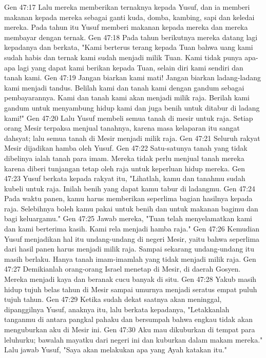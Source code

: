 Gen 47:17  Lalu mereka memberikan ternaknya kepada Yusuf, dan ia memberi makanan kepada mereka sebagai ganti kuda, domba, kambing, sapi dan keledai mereka. Pada tahun itu Yusuf memberi makanan kepada mereka dan mereka membayar dengan ternak.
Gen 47:18  Pada tahun berikutnya mereka datang lagi kepadanya dan berkata, "Kami berterus terang kepada Tuan bahwa uang kami sudah habis dan ternak kami sudah menjadi milik Tuan. Kami tidak punya apa-apa lagi yang dapat kami berikan kepada Tuan, selain diri kami sendiri dan tanah kami.
Gen 47:19  Jangan biarkan kami mati! Jangan biarkan ladang-ladang kami menjadi tandus. Belilah kami dan tanah kami dengan gandum sebagai pembayarannya. Kami dan tanah kami akan menjadi milik raja. Berilah kami gandum untuk menyambung hidup kami dan juga benih untuk ditabur di ladang kami!"
Gen 47:20  Lalu Yusuf membeli semua tanah di mesir untuk raja. Setiap orang Mesir terpaksa menjual tanahnya, karena masa kelaparan itu sangat dahsyat; lalu semua tanah di Mesir menjadi milik raja.
Gen 47:21  Seluruh rakyat Mesir dijadikan hamba oleh Yusuf.
Gen 47:22  Satu-satunya tanah yang tidak dibelinya ialah tanah para imam. Mereka tidak perlu menjual tanah mereka karena diberi tunjangan tetap oleh raja untuk keperluan hidup mereka.
Gen 47:23  Yusuf berkata kepada rakyat itu, "Lihatlah, kamu dan tanahmu sudah kubeli untuk raja. Inilah benih yang dapat kamu tabur di ladangmu.
Gen 47:24  Pada waktu panen, kamu harus memberikan seperlima bagian hasilnya kepada raja. Selebihnya boleh kamu pakai untuk benih dan untuk makanan bagimu dan bagi keluargamu."
Gen 47:25  Jawab mereka, "Tuan telah menyelamatkan kami dan kami berterima kasih. Kami rela menjadi hamba raja."
Gen 47:26  Kemudian Yusuf menjadikan hal itu undang-undang di negeri Mesir, yaitu bahwa seperlima dari hasil panen harus menjadi milik raja. Sampai sekarang undang-undang itu masih berlaku. Hanya tanah imam-imamlah yang tidak menjadi milik raja.
Gen 47:27  Demikianlah orang-orang Israel menetap di Mesir, di daerah Gosyen. Mereka menjadi kaya dan beranak cucu banyak di situ.
Gen 47:28  Yakub masih hidup tujuh belas tahun di Mesir sampai umurnya menjadi seratus empat puluh tujuh tahun.
Gen 47:29  Ketika sudah dekat saatnya akan meninggal, dipanggilnya Yusuf, anaknya itu, lalu berkata kepadanya, "Letakkanlah tanganmu di antara pangkal pahaku dan bersumpah bahwa engkau tidak akan menguburkan aku di Mesir ini.
Gen 47:30  Aku mau dikuburkan di tempat para leluhurku; bawalah mayatku dari negeri ini dan kuburkan dalam makam mereka." Lalu jawab Yusuf, "Saya akan melakukan apa yang Ayah katakan itu."
